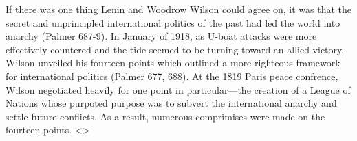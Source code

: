 \documentclass[letterpaper]{article}
\begin{document}
If there was one thing Lenin and Woodrow Wilson could agree on, it was that the secret and unprincipled international politics of the past had led the world into anarchy (Palmer 687-9). In January of 1918, as U-boat attacks were more effectively countered and the tide seemed to be turning toward an allied victory, Wilson unveiled his fourteen points which outlined a more righteous framework for international politics (Palmer 677, 688). At the 1819 Paris peace confrence, Wilson negotiated heavily for one point in particular---the creation of a League of Nations whose purpoted purpose was to subvert the international anarchy and settle future conflicts. As a result, numerous comprimises were made on the fourteen points. <>
\end{document}

